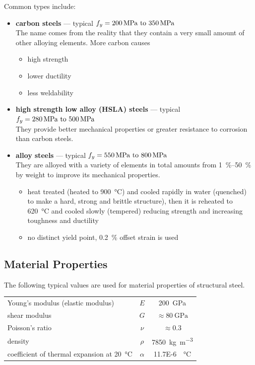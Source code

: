 Common types include:
\begin{itemize}
\item \textbf{carbon steels} --- typical $f_y=\qtyrange{200}{350}{\mpa}$\\
The name comes from the reality that they contain a very small amount of other alloying elements. More carbon causes
\begin{itemize}
\item high strength
\item lower ductility
\item less weldability
\end{itemize}
\item \textbf{high strength low alloy (HSLA) steels} --- typical $f_y=\qtyrange{280}{500}{\mpa}$\\
They provide better mechanical properties or greater resistance to corrosion than carbon steels.
\item \textbf{alloy steels} --- typical $f_y=\qtyrange{550}{800}{\mpa}$\\
They are alloyed with a variety of elements in total amounts from \SIrange{1}{50}{\percent} by weight to improve its mechanical properties.
\begin{itemize}
\item heat treated (heated to \SI{900}{\celsius}) and cooled rapidly in water (quenched) to make a hard, strong and brittle structure), then it is reheated to \SI{620}{\celsius} and cooled slowly (tempered) reducing strength and increasing toughness and ductility
\item no distinct yield point, \SI{0.2}{\percent} offset strain is used
\end{itemize}
\end{itemize}
\subsection{Material Properties}
The following typical values are used for material properties of structural steel.
\begin{table}[H]
\centering
\begin{tabular}{lcc}
	\toprule
	Young's modulus (elastic modulus)                     &   $E$    &      \SI{200}{\giga\pascal}      \\
	shear modulus                                         &   $G$    &  $\approx\SI{80}{\giga\pascal}$  \\
	Poisson's ratio                                       &  $\nu$   &        $\approx\num{0.3}$        \\
	density                                               &  $\rho$  & \SI{7850}{\kilogram\per\meter^3} \\
	coefficient of thermal expansion at \SI{20}{\celsius} & $\alpha$ &    \SI{11.7E-6}{\per\celsius}    \\ \bottomrule
\end{tabular}
\end{table}
